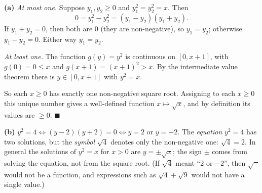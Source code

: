 \textbf{(a)} \emph{At most one.} Suppose $y_1,y_2\ge0$ and $y_1^2=y_2^2=x$. Then
\[0=y_1^2-y_2^2=(y_1-y_2)(y_1+y_2).\]
If $y_1+y_2=0$, then both are $0$ (they are non-negative), so $y_1=y_2$; otherwise $y_1-y_2=0$. Either way $y_1=y_2$.

\emph{At least one.} The function $g(y)=y^2$ is continuous on $[0,x+1]$, with $g(0)=0\le x$ and $g(x+1)=(x+1)^2>x$. By the intermediate value theorem there is $y\in[0,x+1]$ with $y^2=x$.

So each $x\ge0$ has exactly one non-negative square root. Assigning to each $x\ge0$ this unique number gives a well-defined function $x\mapsto\sqrt x$, and by definition its values are $\ge0$. $\blacksquare$

\textbf{(b)} $y^2=4\iff(y-2)(y+2)=0\iff y=2$ or $y=-2$. The \emph{equation} $y^2=4$ has two solutions, but the \emph{symbol} $\sqrt4$ denotes only the non-negative one: $\sqrt4=2$. In general the solutions of $y^2=x$ for $x>0$ are $y=\pm\sqrt x$; the sign $\pm$ comes from solving the equation, not from the square root. (If $\sqrt4$ meant ``$2$ or $-2$'', then $\sqrt{\phantom{x}}$ would not be a function, and expressions such as $\sqrt4+\sqrt9$ would not have a single value.)
